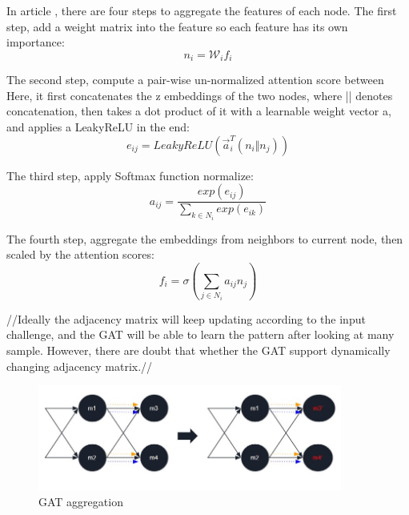 In article \cite{Reference10}, there are four steps to aggregate the features of each node. The first step, add a weight matrix into the feature so each feature has its own importance:
\begin{equation}
    n_i = \mathcal{W}_if_i
\end{equation}

The second step, compute a pair-wise un-normalized attention score between Here, it first concatenates the z embeddings of the two nodes, where || denotes concatenation, then takes a dot product of it
with a learnable weight vector a, and applies a LeakyReLU in the end:
\begin{equation}
    e_{ij} = LeakyReLU(\overrightarrow{a}^T_i(n_i \Vert n_j))
\end{equation}

The third step, apply Softmax function normalize:
\begin{equation}
    a_{ij} = \frac{exp(e_{ij})}{\sum_{k \in N_i}  exp(e_{ik})} 
\end{equation}

The fourth step, aggregate the embeddings from neighbors to current node, then scaled by the attention scores:
\begin{equation}
    f_i = \sigma (\sum_{j \in N_i} a_{ij}n_j)
\end{equation}



//Ideally the adjacency matrix will keep updating according to the input challenge, and the GAT will be able to learn the pattern after looking at many sample. However, there are doubt 
that whether the GAT support dynamically changing adjacency matrix.//

\begin{figure}[htp]
    \centering
    \includegraphics[width=10cm]{figures/figure12.jpg}
    \caption{GAT aggregation}
    \label{fig:figure12}
    \end{figure}



